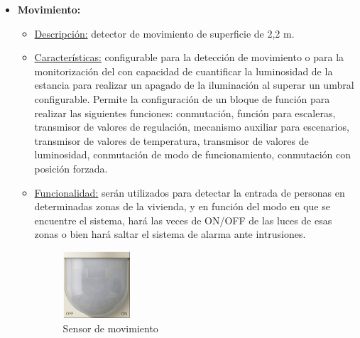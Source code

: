 \begin{itemize}
\item \textbf{Movimiento:} 
	\begin{itemize}
	\item\underline{Descripción:} detector de movimiento de superficie de 2,2 m.
	\item \underline{Características:} configurable para la detección de movimiento o para la monitorización del con capacidad de cuantificar la luminosidad de la estancia para realizar un apagado de la iluminación al superar un umbral configurable. Permite la configuración de un bloque de función para realizar las siguientes funciones: conmutación, función para escaleras, transmisor de valores de regulación, mecanismo auxiliar para escenarios, transmisor de valores de temperatura, transmisor de valores de luminosidad, conmutación de modo de funcionamiento, conmutación con posición forzada.
	\item \underline{Funcionalidad:} serán utilizados para detectar la entrada de personas en determinadas zonas de la vivienda, y en función del modo en que se encuentre el sistema, hará las veces de ON/OFF de las luces de esas zonas o bien hará saltar el sistema de alarma ante intrusiones.
	\begin{figure}[H]
	\centering
	\includegraphics[width=0.25\textwidth]{figures/sensor_movimiento.png}   
	\caption{Sensor de movimiento}
	\label{fig:sensor_movimiento}
	\end{figure}
	\end{itemize} 


\end{itemize}

